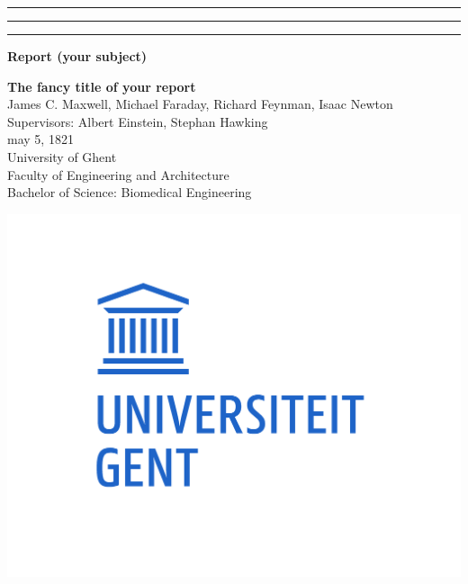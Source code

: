 {\color{ugent_blue} \hrule\hrule\hrule}

\vspace*{-0.43mm}
\colorbox{ugent_blue}{\color{white} \bf Report (your subject)}\\

\noindent\begin{minipage}{0.7\textwidth}%
{\LARGE \bf \color{ugent_blue} The fancy title of your report}\\[2mm]

%
{\large James C. Maxwell, Michael Faraday, Richard Feynman, Isaac Newton}\\
{Supervisors: Albert Einstein, Stephan Hawking}\\
may 5, 1821\\


{\small University of Ghent}\\
{\small Faculty of Engineering and Architecture}\\
{\small Bachelor of Science: Biomedical Engineering}\\
\end{minipage}%
\hfill%
\begin{minipage}{0.3\textwidth}
\vspace{-2.2cm}
\begin{center}
\includegraphics[width=\linewidth]{ugent_logo}
\end{center}
\end{minipage}\\